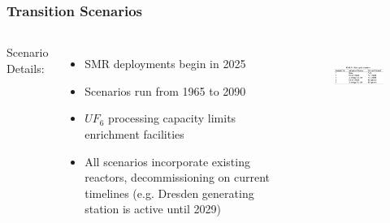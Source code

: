 \begin{frame}
  \frametitle{Transition Scenarios}
  \begin{columns}
    \column[t]{5cm}
    Scenario Details:
      \begin{itemize}
              \item SMR deployments begin in 2025
              \item Scenarios run from 1965 to 2090
              \item $UF_6$ processing capacity limits enrichment facilities
              \item All scenarios incorporate existing reactors, decommissioning on current timelines (e.g. Dresden generating station is active until 2029)
      \end{itemize}
    \column[t]{5cm}
  \begin{figure}[htbp!]
    \begin{center}
      \includegraphics[height=2cm]{./images/scenarios.png}
    \end{center}
          \caption{\cite{bachmann}}
    \label{fig:scenarios}
  \end{figure}
\end{columns}
\end{frame}
